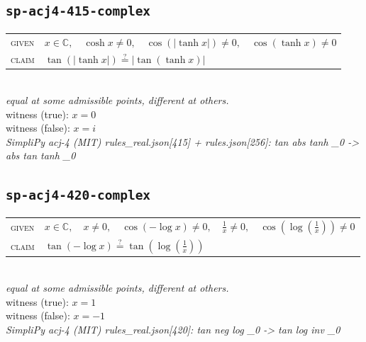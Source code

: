 \documentclass[11pt]{article}
\begin{document}
\subsection*{\texttt{sp-acj4-415-complex}}
\begin{tabular}{@{}l@{\quad}l@{}}
\textsc{given} & $x \in \mathbb{C},\quad \cosh x \neq 0,\quad \cos\left(\left|\tanh x\right|\right) \neq 0,\quad \cos\left(\tanh x\right) \neq 0$ \\[4pt]
\textsc{claim} & $\displaystyle \tan\left(\left|\tanh x\right|\right) \overset{?}{=} \left|\tan\left(\tanh x\right)\right|$ \\
\end{tabular}\\[2pt]
{\small\emph{equal at some admissible points, different at others.}}\\
{\footnotesize\color{gray}witness (true): $x = 0$}\\
{\footnotesize\color{gray}witness (false): $x = i$}\\
\emph{SimpliPy acj-4 (MIT) rules\_real.json[415] + rules.json[256]: tan abs tanh \_0  ->  abs tan tanh \_0}\\

\subsection*{\texttt{sp-acj4-420-complex}}
\begin{tabular}{@{}l@{\quad}l@{}}
\textsc{given} & $x \in \mathbb{C},\quad x \neq 0,\quad \cos\left(-\log x\right) \neq 0,\quad \frac{1}{x} \neq 0,\quad \cos\left(\log\left(\frac{1}{x}\right)\right) \neq 0$ \\[4pt]
\textsc{claim} & $\displaystyle \tan\left(-\log x\right) \overset{?}{=} \tan\left(\log\left(\frac{1}{x}\right)\right)$ \\
\end{tabular}\\[2pt]
{\small\emph{equal at some admissible points, different at others.}}\\
{\footnotesize\color{gray}witness (true): $x = 1$}\\
{\footnotesize\color{gray}witness (false): $x = -1$}\\
\emph{SimpliPy acj-4 (MIT) rules\_real.json[420]: tan neg log \_0  ->  tan log inv \_0}\\
\end{document}
